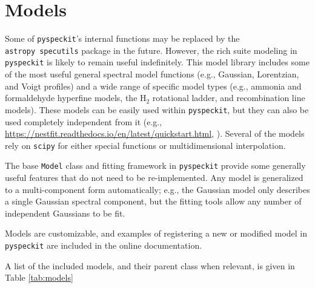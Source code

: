 \documentclass[twocolumn]{aastex63}
\newcommand{\pyspeckit}{\texttt{pyspeckit}\xspace}
\newcommand{\astropy}{\texttt{astropy}\xspace}
\newcommand{\hh}{\ensuremath{\mathrm{H}_2}\xspace}
\begin{document}
\section{Models}
\label{sec:models}
Some of \pyspeckit's internal functions may be replaced by the \astropy\
\texttt{specutils} package in the future.  However, the rich suite modeling in
\pyspeckit is likely to remain useful indefinitely.  This model library
includes some of the most useful general spectral model functions (e.g.,
Gaussian, Lorentzian, and Voigt profiles) and a wide range of specific model
types (e.g., ammonia and formaldehyde hyperfine models, the \hh rotational
ladder, and recombination line models).  These models can be easily used
within \pyspeckit, but they can also be used completely independent from
it (e.g., \url{https://nestfit.readthedocs.io/en/latest/quickstart.html}, \citealt{brian_svoboda_2021_4470028}).
Several of the models rely on \texttt{scipy} \citep{Virtanen2020} for either special functions or multidimensional interpolation.

The base \texttt{Model} class and fitting framework in \pyspeckit provide some
generally useful features that do not need to be re-implemented.  Any model is
generalized to a multi-component form automatically; e.g., the Gaussian model
only describes a single Gaussian spectral component, but the fitting tools
allow any number of independent Gaussians to be fit.

Models are customizable, and examples of registering a new or modified
model in \pyspeckit are included in the online documentation.

A list of the included models, and their parent class when relevant,
is given in Table \ref{tab:models}
\end{document}
